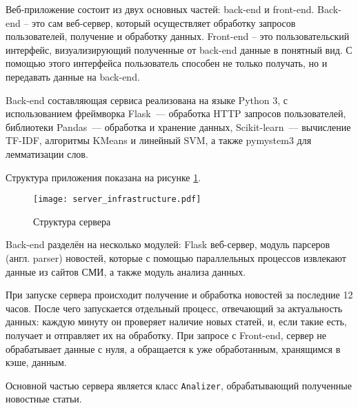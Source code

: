 Веб-приложение состоит из двух основных частей: back-end и front-end. Back-end -- это сам веб-сервер,
который осуществляет обработку запросов пользователей, получение и обработку данных.
Front-end -- это пользовательский интерфейс, визуализирующий полученные от back-end данные в понятный вид.
С помощью этого интерфейса пользователь способен не только получать, но и передавать данные на back-end.

Back-end составляющая сервиса реализована на языке Python 3, с использованием фреймворка Flask~---
обработка HTTP запросов пользователей, библиотеки Pandas~--- обработка и хранение данных, Scikit-learn~--- вычисление TF-IDF,
алгоритмы KMeans и линейный SVM, а также pymystem3 для лемматизации слов.

Структура приложения показана на рисунке \ref{server_struct}.
\begin{figure}[h]
    \centering
    \texttt{[image: server\_infrastructure.pdf]}
    \caption{Структура сервера}
    \label{server_struct}
\end{figure}

Back-end разделён на несколько модулей: Flask веб-сервер, модуль парсеров (англ. parser) новостей, которые
с помощью параллельных процессов извлекают данные из сайтов СМИ, а также модуль анализа данных.

При запуске сервера происходит получение и обработка новостей за последние 12 часов.
После чего запускается отдельный процесс, отвечающий за актуальность данных: каждую минуту он
проверяет наличие новых статей, и, если такие есть, получает и отправляет их на обработку. При запросе с Front-end,
сервер не обрабатывает данные с нуля, а обращается к уже обработанным, хранящимся в кэше, данным.

Основной частью сервера является класс \verb|Analizer|, обрабатывающий полученные
новостные статьи.

